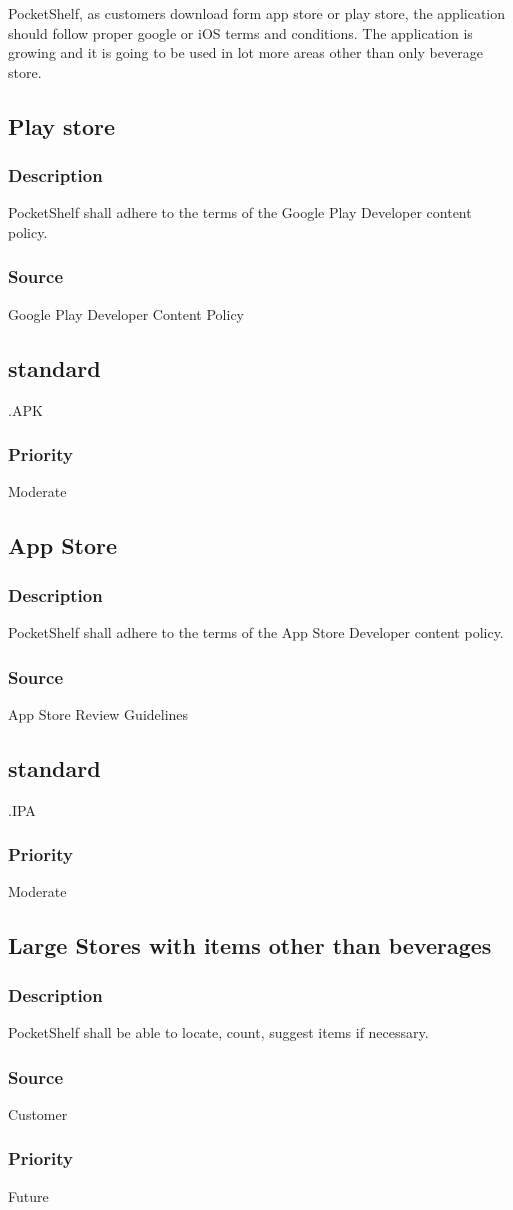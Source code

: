 PocketShelf, as customers download form app store or play store, the application should follow proper google or iOS terms and conditions. The application is growing and it is going to be used in lot more areas other than only beverage store.

\subsection{Play store}
\subsubsection{Description}
PocketShelf shall adhere to the terms of the Google Play Developer content policy.
\subsubsection{Source}
 Google Play Developer Content Policy 
 \subsection{standard}
 .APK
\subsubsection{Priority}
Moderate\\


\subsection{App Store}
\subsubsection{Description}
PocketShelf shall adhere to the terms of the App Store Developer content policy.
\subsubsection{Source}
App Store Review Guidelines
\subsection{standard}
 .IPA
\subsubsection{Priority}
Moderate

\subsection{Large Stores with items other than beverages}
\subsubsection{Description}
PocketShelf shall be able to locate, count, suggest items if necessary.
\subsubsection{Source}
Customer
\subsubsection{Priority}
Future